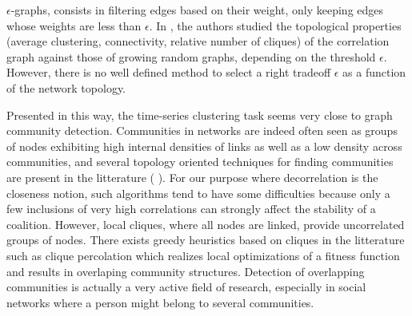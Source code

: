 \documentclass[conference]{IEEEtran}
\begin{document}
$\epsilon$-graphs, consists in filtering edges based on their weight, only keeping edges whose weights are less than $ \epsilon $. In \cite{Garas2008, Onnela2004}, the authors studied the topological properties (average clustering, connectivity, relative number of cliques) of the correlation graph against those of growing random graphs, depending on the threshold $ \epsilon $. However, there is no well defined method to select a right tradeoff $ \epsilon $ as a function of the network topology.

Presented in this way, the time-series clustering task seems very close to graph community detection. Communities in networks are indeed often seen as groups of nodes exhibiting high internal densities of links as well as a low density across communities, and several topology oriented techniques for finding communities are present in the litterature (\cite{Newmanb} \cite{Girvan2002} \cite{Newman}). For our purpose where decorrelation is the closeness notion, such algorithms tend to have some difficulties because only a few inclusions of very high correlations can strongly affect the stability of a coalition. However, local cliques, where all nodes are linked, provide uncorrelated groups of nodes. There exists greedy heuristics based on cliques in the litterature such as clique percolation \cite{Lancichinetti} which realizes local optimizations of a fitness function and results in overlaping community structures. Detection of overlapping communities is actually a very active field of research, especially in social networks where a person might belong to several communities.  

\end{document}
